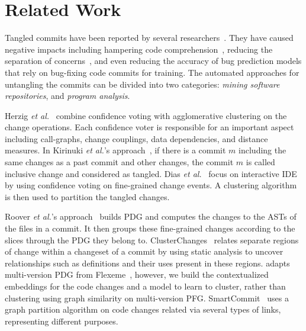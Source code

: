 \section{Related Work}
\label{related:sec}

Tangled commits have been reported by several
researchers~\cite{tao-fse12,kim-emse16,kim-msr13,hill-tse12,nguyen-issre13,flexeme-fse20,smartcommit-fse21}. They
have caused negative impacts including hampering code
comprehension~\cite{tao-fse12}, reducing the separation of
concerns~\cite{flexeme-fse20}, and even reducing the accuracy of bug
prediction models that rely on bug-fixing code commits for training.
The automated approaches for untangling the commits can be divided
into two categories: {\em mining software repositories}, and {\em
  program analysis}.

 Herzig {\em et
  al.}~\cite{kim-msr13,kim-emse16} combine confidence voting with
agglomerative clustering on the change operations. Each confidence
voter is responsible for an important aspect including call-graphs,
change couplings, data dependencies, and distance measures. In
Kirinuki {\em et al.}'s approach~\cite{higo-apsec16, higo-icpc14}, if
there is a commit $m$ including the same changes as a past commit and
other changes, the commit $m$ is called inclusive change and
considered as tangled.  Dias {\em et al.}~\cite{dias-saner15} focus on
interactive IDE by using confidence voting on fine-grained change
events. A clustering algorithm is then used to partition the tangled
changes.


 Roover {\em et al.}'s
approach~\cite{roover-scam18} builds PDG and computes the changes to
the ASTs of the files in a commit. It then groups these fine-grained
changes according to the slices through the PDG they belong to.
ClusterChanges~\cite{barnett-icse15} relates separate regions of
change within a changeset of a commit by using static analysis to
uncover relationships such as definitions and their uses present in
these regions. {\tool} adapts multi-version PDG from
Flexeme~\cite{flexeme-fse20}, however, we build the contextualized
embeddings for the code changes and a model to learn to cluster,
rather than clustering using graph similarity on multi-version PFG.
SmartCommit~\cite{smartcommit-fse21} uses a graph partition algorithm
on code changes related via several types of links, representing
different purposes.



